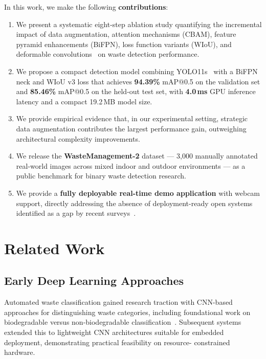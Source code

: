 \documentclass[runningheads]{llncs}
\begin{document}
In this work, we make the following \textbf{contributions}:
\begin{enumerate}
  \item We present a systematic eight-step ablation study quantifying
        the incremental impact of data augmentation, attention
        mechanisms (CBAM), feature pyramid enhancements (BiFPN), loss
        function variants (WIoU), and deformable convolutions~\cite{dai2017deformable} on
        waste detection performance.
  \item We propose a compact detection model combining YOLO11s~\cite{yolo11}
        with a BiFPN neck and WIoU v3 loss that achieves \textbf{94.39\%}
        mAP@0.5 on the validation set and \textbf{85.46\%} mAP@0.5
        on the held-out test set, with \textbf{4.0\,ms} GPU inference
        latency and a compact 19.2\,MB model size.
  \item We provide empirical evidence that, in our experimental setting,
        strategic data augmentation contributes the largest performance gain,
        outweighing architectural complexity improvements.
  \item We release the \textbf{WasteManagement-2} dataset — 3,000
        manually annotated real-world images across mixed indoor and
        outdoor environments — as a public benchmark for binary waste
        detection research.
  \item We provide a \textbf{fully deployable real-time demo
        application} with webcam support, directly addressing the
        absence of deployment-ready open systems identified as a gap
        by recent surveys~\cite{springer_survey2024}.
\end{enumerate}


\section{Related Work}
\label{sec:related}

\subsection{Early Deep Learning Approaches}

Automated waste classification gained research traction with
CNN-based approaches for distinguishing waste categories, including
foundational work on biodegradable versus non-biodegradable
classification~\cite{autoclassify2017}. Subsequent systems extended
this to lightweight CNN architectures suitable for embedded
deployment, demonstrating practical feasibility on resource-
constrained hardware.
\end{document}
